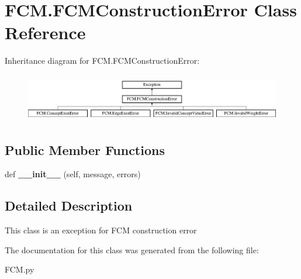 \hypertarget{class_f_c_m_1_1_f_c_m_construction_error}{}\section{F\+C\+M.\+F\+C\+M\+Construction\+Error Class Reference}
\label{class_f_c_m_1_1_f_c_m_construction_error}
Inheritance diagram for F\+C\+M.\+F\+C\+M\+Construction\+Error\+:\begin{figure}[H]
\begin{center}
\leavevmode
\includegraphics[height=2.110553cm]{class_f_c_m_1_1_f_c_m_construction_error}
\end{center}
\end{figure}
\subsection*{Public Member Functions}
\begin{DoxyCompactItemize}
\item 
\hypertarget{class_f_c_m_1_1_f_c_m_construction_error_a843bdbfe3b6d66d7b84b86bc1990c691}{}\label{class_f_c_m_1_1_f_c_m_construction_error_a843bdbfe3b6d66d7b84b86bc1990c691} 
def {\bfseries \+\_\+\+\_\+init\+\_\+\+\_\+} (self, message, errors)
\end{DoxyCompactItemize}


\subsection{Detailed Description}
\begin{DoxyVerb}This class is an exception for FCM construction error
\end{DoxyVerb}
 

The documentation for this class was generated from the following file\+:\begin{DoxyCompactItemize}
\item 
F\+C\+M.\+py\end{DoxyCompactItemize}
